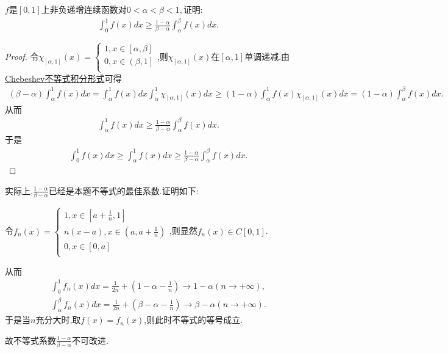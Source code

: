 \documentclass[lang=cn,newtx,10pt,scheme=chinese]{../Template/elegantbook}
\begin{document}
\begin{example}
$f$是$[0,1]$上非负递增连续函数对$0 < \alpha < \beta < 1,$证明:
\begin{gather}
\int_{0}^{1} f(x) dx \geq \frac{1 - \alpha}{\beta - \alpha} \int_{\alpha}^{\beta} f(x) dx.
\nonumber
\end{gather}
\end{example}
\begin{proof}
令$\chi _{\left[ \alpha ,1 \right]}\left( x \right) =\begin{cases}
1,x\in \left[ \alpha ,\beta \right]\\
0,x\in \left( \beta ,1 \right]\\
\end{cases}$,则$\chi _{\left[ \alpha ,1 \right]}\left( x \right)$在$[\alpha,1]$单调递减.由\hyperref[Basis of Analytics-Chebeshev不等式积分形式]{Chebeshev不等式积分形式}可得
\begin{align*}
\left( \beta -\alpha \right) \int_{\alpha}^1{f(x)dx}=\int_{\alpha}^1{f(x)dx\int_{\alpha}^1{\chi _{\left[ \alpha ,1 \right]}\left( x \right) dx}}\geqslant \left( 1-\alpha \right) \int_{\alpha}^1{f\left( x \right) \chi _{\left[ \alpha ,1 \right]}\left( x \right) dx}=\left( 1-\alpha \right) \int_{\alpha}^{\beta}{f\left( x \right) dx}.
\nonumber
\end{align*}
从而
\begin{align*}
\int_{\alpha}^1{f(x)dx}\geqslant \frac{1-\alpha}{\beta -\alpha}\int_{\alpha}^{\beta}{f\left( x \right) dx}.
\nonumber
\end{align*}
于是
\begin{align*}
\int_0^1{f(x)dx}\geqslant \int_{\alpha}^1{f(x)dx}\geqslant \frac{1-\alpha}{\beta -\alpha}\int_{\alpha}^{\beta}{f\left( x \right) dx}.
\nonumber
\end{align*}
\end{proof}
\begin{remark}
实际上,$\frac{1-\alpha}{\beta -\alpha}$已经是本题不等式的最佳系数.证明如下:

令$f_n\left( x \right) =\begin{cases}
1,x\in \left[ a+\frac{1}{n},1 \right]\\
n\left( x-a \right) ,x\in \left( a,a+\frac{1}{n} \right)\\
0,x\in \left[ 0,a \right]\\
\end{cases}$,则显然$f_n(x)\in C[0,1]$.

从而
\begin{align*}
\int_0^1{f_n\left( x \right) dx}=\frac{1}{2n}+\left( 1-\alpha -\frac{1}{n} \right) \rightarrow 1-\alpha \left( n\rightarrow +\infty \right) ,
\\
\int_{\alpha}^{\beta}{f_n\left( x \right) dx}=\frac{1}{2n}+\left( \beta -\alpha -\frac{1}{n} \right) \rightarrow \beta -\alpha \left( n\rightarrow +\infty \right) .
\nonumber
\end{align*}
于是当$n$充分大时,取$f(x)=f_n(x)$,则此时不等式的等号成立.

故不等式系数$\frac{1-\alpha}{\beta -\alpha}$不可改进.
\end{remark}
\end{document}
